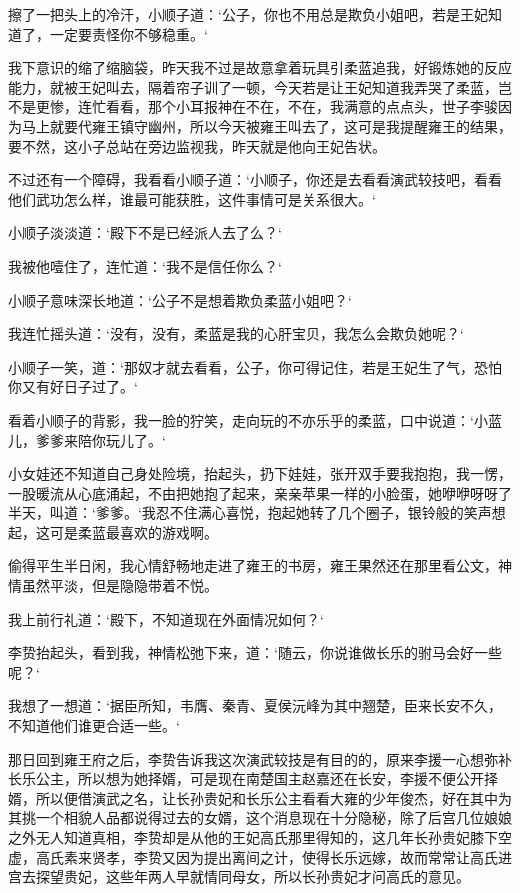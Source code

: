 擦了一把头上的冷汗，小顺子道：‘公子，你也不用总是欺负小姐吧，若是王妃知道了，一定要责怪你不够稳重。‘

我下意识的缩了缩脑袋，昨天我不过是故意拿着玩具引柔蓝追我，好锻炼她的反应能力，就被王妃叫去，隔着帘子训了一顿，今天若是让王妃知道我弄哭了柔蓝，岂不是更惨，连忙看看，那个小耳报神在不在，不在，我满意的点点头，世子李骏因为马上就要代雍王镇守幽州，所以今天被雍王叫去了，这可是我提醒雍王的结果，要不然，这小子总站在旁边监视我，昨天就是他向王妃告状。

不过还有一个障碍，我看看小顺子道：‘小顺子，你还是去看看演武较技吧，看看他们武功怎么样，谁最可能获胜，这件事情可是关系很大。‘

小顺子淡淡道：‘殿下不是已经派人去了么？‘

我被他噎住了，连忙道：‘我不是信任你么？‘

小顺子意味深长地道：‘公子不是想着欺负柔蓝小姐吧？‘

我连忙摇头道：‘没有，没有，柔蓝是我的心肝宝贝，我怎么会欺负她呢？‘

小顺子一笑，道：‘那奴才就去看看，公子，你可得记住，若是王妃生了气，恐怕你又有好日子过了。‘

看着小顺子的背影，我一脸的狞笑，走向玩的不亦乐乎的柔蓝，口中说道：‘小蓝儿，爹爹来陪你玩儿了。‘

小女娃还不知道自己身处险境，抬起头，扔下娃娃，张开双手要我抱抱，我一愣，一股暖流从心底涌起，不由把她抱了起来，亲亲苹果一样的小脸蛋，她咿咿呀呀了半天，叫道：‘爹爹。‘我忍不住满心喜悦，抱起她转了几个圈子，银铃般的笑声想起，这可是柔蓝最喜欢的游戏啊。

偷得平生半日闲，我心情舒畅地走进了雍王的书房，雍王果然还在那里看公文，神情虽然平淡，但是隐隐带着不悦。

我上前行礼道：‘殿下，不知道现在外面情况如何？‘

李贽抬起头，看到我，神情松弛下来，道：‘随云，你说谁做长乐的驸马会好一些呢？‘

我想了一想道：‘据臣所知，韦膺、秦青、夏侯沅峰为其中翘楚，臣来长安不久，不知道他们谁更合适一些。‘

那日回到雍王府之后，李贽告诉我这次演武较技是有目的的，原来李援一心想弥补长乐公主，所以想为她择婿，可是现在南楚国主赵嘉还在长安，李援不便公开择婿，所以便借演武之名，让长孙贵妃和长乐公主看看大雍的少年俊杰，好在其中为其挑一个相貌人品都说得过去的女婿，这个消息现在十分隐秘，除了后宫几位娘娘之外无人知道真相，李贽却是从他的王妃高氏那里得知的，这几年长孙贵妃膝下空虚，高氏素来贤孝，李贽又因为提出离间之计，使得长乐远嫁，故而常常让高氏进宫去探望贵妃，这些年两人早就情同母女，所以长孙贵妃才问高氏的意见。

